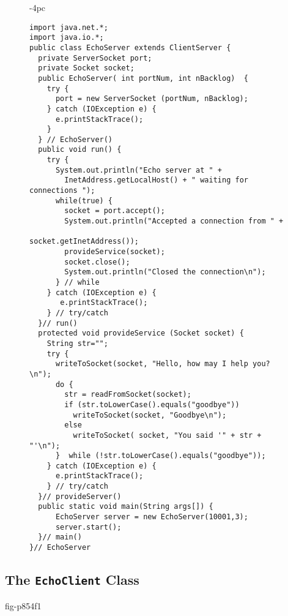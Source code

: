 \begin{figure}[p]
\jjjprogstart
\begin{jjjlistingleft}[30pc]{-4pc}
\begin{lstlisting}
import java.net.*;
import java.io.*;
public class EchoServer extends ClientServer {
  private ServerSocket port;
  private Socket socket;
  public EchoServer( int portNum, int nBacklog)  {
    try {
      port = new ServerSocket (portNum, nBacklog);
    } catch (IOException e) {
      e.printStackTrace();
    }
  } // EchoServer()
  public void run() {
    try {
      System.out.println("Echo server at " + 
        InetAddress.getLocalHost() + " waiting for connections ");
      while(true) {
        socket = port.accept();
        System.out.println("Accepted a connection from " + 
                                        socket.getInetAddress());
        provideService(socket);
        socket.close();
        System.out.println("Closed the connection\n");
      } // while
    } catch (IOException e) {
       e.printStackTrace();
    } // try/catch
  }// run()
  protected void provideService (Socket socket) {
    String str="";
    try {
      writeToSocket(socket, "Hello, how may I help you?\n");
      do {
        str = readFromSocket(socket);
        if (str.toLowerCase().equals("goodbye"))
          writeToSocket(socket, "Goodbye\n");
        else
          writeToSocket( socket, "You said '" + str + "'\n");
      }  while (!str.toLowerCase().equals("goodbye"));
    } catch (IOException e) {
      e.printStackTrace();
    } // try/catch
  }// provideServer()
  public static void main(String args[]) {
      EchoServer server = new EchoServer(10001,3);
      server.start();
  }// main()
}// EchoServer
\end{lstlisting}
\end{jjjlistingleft}
\end{figure}

\pagebreak
\subsection{The {\tt EchoClient} Class}


{fig-p854f1}

